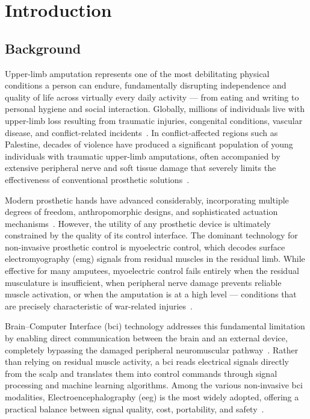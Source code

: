 \chapter{Introduction}
\label{ch:introduction}

\section{Background}
\label{sec:background}

Upper-limb amputation represents one of the most debilitating physical
conditions a person can endure, fundamentally disrupting independence
and quality of life across virtually every daily activity — from eating
and writing to personal hygiene and social interaction. Globally,
millions of individuals live with upper-limb loss resulting from
traumatic injuries, congenital conditions, vascular disease, and
conflict-related incidents~\cite{ziegler2008prevalence}. In
conflict-affected regions such as Palestine, decades of violence have
produced a significant population of young individuals with traumatic
upper-limb amputations, often accompanied by extensive peripheral nerve
and soft tissue damage that severely limits the effectiveness of
conventional prosthetic solutions~\cite{who2022assistive}.

Modern prosthetic hands have advanced considerably, incorporating
multiple degrees of freedom, anthropomorphic designs, and sophisticated
actuation mechanisms~\cite{ten2017review}. However, the utility of
any prosthetic device is ultimately constrained by the quality of its
control interface. The dominant technology for non-invasive prosthetic
control is myoelectric control, which decodes surface
electromyography (\acrshort{emg}) signals from residual muscles in the
residual limb. While effective for many amputees, myoelectric control
fails entirely when the residual musculature is insufficient, when
peripheral nerve damage prevents reliable muscle activation, or when
the amputation is at a high level — conditions that are precisely
characteristic of war-related injuries~\cite{al2013classification}.

Brain--Computer Interface (\acrshort{bci}) technology addresses this
fundamental limitation by enabling direct communication between the
brain and an external device, completely bypassing the damaged
peripheral neuromuscular pathway~\cite{wolpaw2002bci}. Rather than
relying on residual muscle activity, a \acrshort{bci} reads electrical
signals directly from the scalp and translates them into control
commands through signal processing and machine learning algorithms.
Among the various non-invasive \acrshort{bci} modalities,
Electroencephalography (\acrshort{eeg}) is the most widely adopted,
offering a practical balance between signal quality, cost,
portability, and safety~\cite{lotte2007review}.

